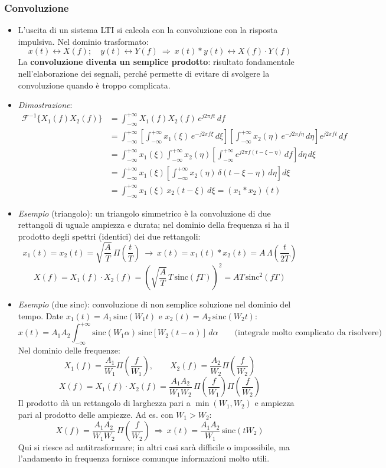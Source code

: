 \documentclass[12pt, a4paper]{article}
\begin{document}
\subsubsection{Convoluzione}
\begin{itemize}
    \item L'uscita di un sistema LTI si calcola con la convoluzione con la risposta impulsiva. Nel dominio trasformato:
    $$x(t)\longleftrightarrow X(f);\quad y(t)\longleftrightarrow Y(f)\ \Longrightarrow\ x(t)*y(t)\longleftrightarrow X(f)\cdot Y(f)$$
    La \textbf{convoluzione diventa un semplice prodotto}: risultato fondamentale nell'elaborazione dei segnali, perché permette di evitare di svolgere la convoluzione quando è troppo complicata.
    \item \textit{Dimostrazione}:
    \begin{align*}
        \mathcal{F}^{-1}\{X_1(f)X_2(f)\}&=\int_{-\infty}^{+\infty}X_1(f)X_2(f)\,e^{j2\pi ft}\,df\\
        &=\int_{-\infty}^{+\infty}\left[\int_{-\infty}^{+\infty}x_1(\xi)\,e^{-j2\pi f\xi}\,d\xi\right]\left[\int_{-\infty}^{+\infty}x_2(\eta)\,e^{-j2\pi f\eta}\,d\eta\right]e^{j2\pi ft}\,df\\
        &=\int_{-\infty}^{+\infty}x_1(\xi)\int_{-\infty}^{+\infty}x_2(\eta)\left[\int_{-\infty}^{+\infty}e^{j2\pi f(t-\xi-\eta)}\,df\right]d\eta\,d\xi\\
        &=\int_{-\infty}^{+\infty}x_1(\xi)\left[\int_{-\infty}^{+\infty}x_2(\eta)\,\delta(t-\xi-\eta)\,d\eta\right]d\xi\\
        &=\int_{-\infty}^{+\infty}x_1(\xi)\,x_2(t-\xi)\,d\xi=(x_1*x_2)(t)
    \end{align*}
    \item \textit{Esempio} (triangolo): un triangolo simmetrico è la convoluzione di due rettangoli di uguale ampiezza e durata; nel dominio della frequenza si ha il prodotto degli spettri (identici) dei due rettangoli:
    $$x_1(t)=x_2(t)=\sqrt{\frac AT}\,\Pi\!\left(\frac tT\right)\ \to\ x(t)=x_1(t)*x_2(t)=A\,\Lambda\!\left(\frac{t}{2T}\right)$$
    $$X(f)=X_1(f)\cdot X_2(f)=\left(\sqrt{\frac AT}\,T\,\text{sinc}(fT)\right)^2=AT\,\text{sinc}^2(fT)$$
    \item \textit{Esempio} (due sinc): convoluzione di non semplice soluzione nel dominio del tempo. Date $x_1(t)=A_1\,\text{sinc}(W_1t)$ e $x_2(t)=A_2\,\text{sinc}(W_2t)$:
    $$x(t)=A_1A_2\int_{-\infty}^{+\infty}\text{sinc}(W_1\alpha)\,\text{sinc}[W_2(t-\alpha)]\,d\alpha\qquad\text{(integrale molto complicato da risolvere)}$$
    Nel dominio delle frequenze:
    $$X_1(f)=\frac{A_1}{W_1}\Pi\!\left(\frac{f}{W_1}\right),\qquad X_2(f)=\frac{A_2}{W_2}\Pi\!\left(\frac{f}{W_2}\right)$$
    $$X(f)=X_1(f)\cdot X_2(f)=\frac{A_1A_2}{W_1W_2}\,\Pi\!\left(\frac{f}{W_1}\right)\Pi\!\left(\frac{f}{W_2}\right)$$
    Il prodotto dà un rettangolo di larghezza pari a $\min(W_1,W_2)$ e ampiezza pari al prodotto delle ampiezze. Ad es. con $W_1>W_2$:
    $$X(f)=\frac{A_1A_2}{W_1W_2}\,\Pi\!\left(\frac{f}{W_2}\right)\ \Longrightarrow\ x(t)=\frac{A_1A_2}{W_1}\,\text{sinc}(tW_2)$$
    Qui si riesce ad antitrasformare; in altri casi sarà difficile o impossibile, ma l'andamento in frequenza fornisce comunque informazioni molto utili.
\end{itemize}
\end{document}

